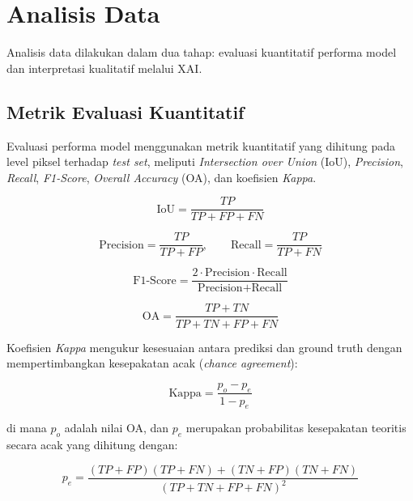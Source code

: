 \section{Analisis Data}

Analisis data dilakukan dalam dua tahap: evaluasi kuantitatif performa model dan interpretasi kualitatif melalui XAI.

\subsection{Metrik Evaluasi Kuantitatif}

Evaluasi performa model menggunakan metrik kuantitatif yang dihitung pada level piksel terhadap \textit{test set}, meliputi \textit{Intersection over Union} (IoU), \textit{Precision}, \textit{Recall}, \textit{F1-Score}, \textit{Overall Accuracy} (OA), dan koefisien \textit{Kappa}.

\begin{equation}
	\text{IoU} = \frac{TP}{TP + FP + FN}
\end{equation}

\begin{equation}
	\text{Precision} = \frac{TP}{TP + FP}, \qquad \text{Recall} = \frac{TP}{TP + FN}
\end{equation}

\begin{equation}
	\text{F1-Score} = \frac{2 \cdot \text{Precision} \cdot \text{Recall}}{\text{Precision} + \text{Recall}}
\end{equation}

\begin{equation}
	\text{OA} = \frac{TP + TN}{TP + TN + FP + FN}
\end{equation}

Koefisien \textit{Kappa} mengukur kesesuaian antara prediksi dan ground truth dengan mempertimbangkan kesepakatan acak (\textit{chance agreement}):

\begin{equation}
	\text{Kappa} = \frac{p_o - p_e}{1 - p_e}
\end{equation}

\noindent di mana $p_o$ adalah nilai OA, dan $p_e$ merupakan probabilitas kesepakatan teoritis secara acak yang dihitung dengan:

\begin{equation}
	p_e = \frac{(TP+FP)(TP+FN) + (TN+FP)(TN+FN)}{(TP+TN+FP+FN)^2}
\end{equation}

